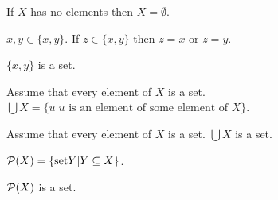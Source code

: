 \begin{lemma}
If $X$ has no elements then $X=\emptyset$.
\end{lemma}

\begin{lemma}$x,y \in \{x,y\}$. If $z \in \{x,y\}$ then $z=x$ or $z=y$.
\end{lemma}

\begin{lemma}
$\{x,y\}$ is a set.
\end{lemma} 

\begin{definition}
Assume that every element of $X$ is a set.
$\bigcup X = \{ u | u \text{ is an element of some element of } X\}$.
\end{definition}

\begin{axiom}
Assume that every element of $X$ is a set.
$\bigcup X$ is a set.
\end{axiom}

\begin{definition}
${\cal P}(X) = \{\text{set} Y | Y \subseteq X \}$.
\end{definition}

\begin{axiom}
${\cal P}(X)$ is a set.
\end{axiom}






